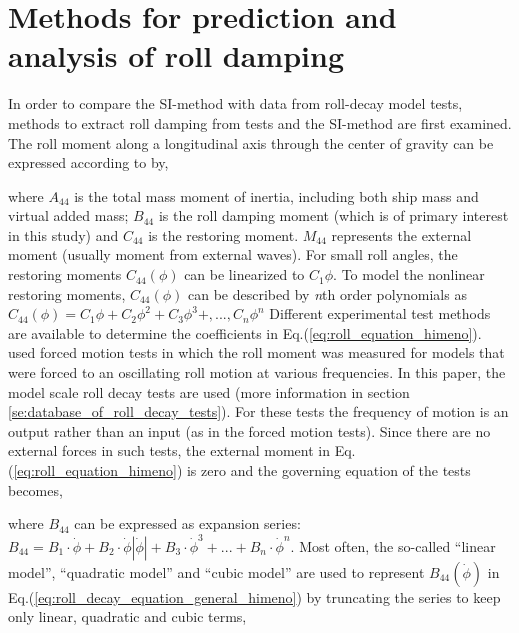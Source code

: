 \section{Methods for prediction and analysis of roll damping}
\label{se:methods_for_prediction_and_analysis}
In order to compare the SI-method with data from roll-decay model tests, methods to extract roll damping from tests and the SI-method are first examined. The roll moment along a longitudinal axis through the center of gravity can be expressed according to  \parencite{himeno_prediction_1981} by,

 

where $A_{44}$ is the total mass moment of inertia, including both ship mass and virtual added mass; $B_{44}$ is the roll damping moment (which is of primary interest in this study) and $C_{44}$ is the restoring moment. $M_{44}$ represents the external moment (usually moment from external waves). For small roll angles, the restoring moments $C_{44}(\phi)$ can be linearized to $C_{1}\phi$. To model the nonlinear restoring moments, $C_{44}(\phi)$ can be described by \emph{n}th order polynomials as $C_{44}(\phi) = C_{1}\phi + C_{2}\phi^2 + C_{3}\phi^3 +, ..., C_{n}\phi^n $
Different experimental test methods are available to determine the coefficients in Eq.(\ref{eq:roll_equation_himeno}). \parencite{ikeda_components_1978} used forced motion tests in which the roll moment was measured for models that were forced to an oscillating roll motion at various frequencies. In this paper, the model scale roll decay tests are used (more information in section \ref{se:database_of_roll_decay_tests}). For these tests the frequency of motion is an output rather than an input (as in the forced motion tests).  Since there are no external forces in such tests, the external moment in Eq.(\ref{eq:roll_equation_himeno}) is zero and the governing equation of the tests becomes, 




where $B_{44}$ can be expressed as expansion series:  
$ B_{44} = B_1\cdot\dot{\phi} + B_2\cdot\dot{\phi}\left|\dot{\phi}\right| + B_3\cdot\dot{\phi}^3 + ... + B_n\cdot\dot{\phi}^n$. Most often, the so-called ``linear model'', ``quadratic model'' and ``cubic model'' are used to represent $B_{44}(\dot{\phi})$ in Eq.(\ref{eq:roll_decay_equation_general_himeno}) by truncating the series to keep only linear, quadratic and cubic terms,

